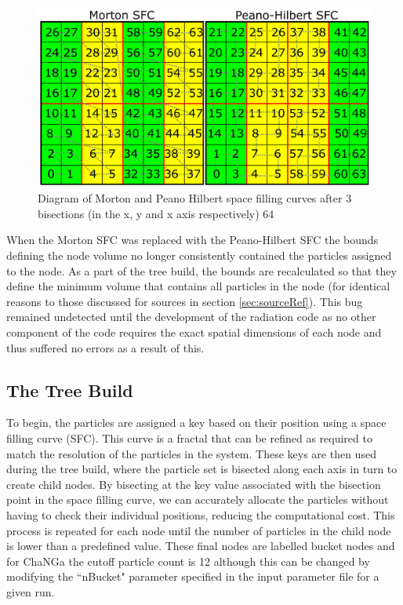 \begin{figure}[H]
    \centering
    \includegraphics[width=\textwidth]{plots/CH3/SFCCompare.png}
    \caption{Diagram of Morton and Peano Hilbert space filling curves after 3 bisections (in the x, y and x axis respectively) 64}
    \label{fig:SFC}
\end{figure}

When the Morton SFC was replaced with the Peano-Hilbert SFC the bounds defining the node volume no longer consistently contained the particles assigned to the node. As a part of the tree build, the bounds are recalculated so that they define the minimum volume that contains all particles in the node (for identical reasons to those discussed for sources in section \ref{sec:sourceRef}). This bug remained undetected until the development of the radiation code as no other component of the code requires the exact spatial dimensions of each node and thus suffered no errors as a result of this. 

\subsection{The Tree Build}

To begin, the particles are assigned a key based on their position using a space filling curve (SFC). This curve is a fractal that can be refined as required to match the resolution of the particles in the system. These keys are then used during the tree build, where the particle set is bisected along each axis in turn to create child nodes. By bisecting at the key value associated with the bisection point in the space filling curve, we can accurately allocate the particles without having to check their individual positions, reducing the computational cost. This process is repeated for each node until the number of particles in the child node is lower than a predefined value. These final nodes are labelled bucket nodes and for ChaNGa the cutoff particle count is 12 although this can be changed by modifying the ``nBucket" parameter specified in the input parameter file for a given run.


